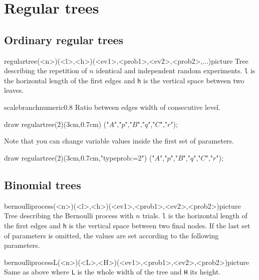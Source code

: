 \documentclass[11pt,a4paper,english]{article}
\begin{document}
\section{Regular trees}
\subsection{Ordinary regular trees}

\begin{rpobjet}{regulartree(<n>)(<l>,<h>)(<ev1>,<prob1>,<ev2>,<prob2>,...)}{picture}
Tree describing the repetition of $n$ identical and independent random experiments. \verb|l| is the horizontal length of the first edges and \verb|h| is the vertical space between two leaves.
\end{rpobjet}

\begin{mptparam}{scalebranch}{numeric}{0.8}
Ratio between edges width of consecutive level.
\end{mptparam}

\begin{exemple}[lefthand ratio=0.6]
draw regulartree(2)(3cm,0.7cm)
              ("$A$","$p$","$B$","$q$","$C$","$r$");
\end{exemple}

Note that you can change variable values inside the first set of parameters.

\begin{exemple}[lefthand ratio=0.6]
draw regulartree(2)(3cm,0.7cm,"typeprob:=2")
              ("$A$","$p$","$B$","$q$","$C$","$r$");
\end{exemple}


\subsection{Binomial trees}

\begin{rpobjet}{bernoulliprocess(<n>)(<l>,<h>)(<ev1>,<prob1>,<ev2>,<prob2>)}{picture}
Tree describing the Bernoulli process with $n$ trials. \verb|l| is the horizontal length of the first edges and \verb|h| is the vertical space between two final nodes. If the last set of parameters is omitted, the values are set according to the following parameters.
\end{rpobjet}


\begin{rpobjet}{bernoulliprocessL(<n>)(<L>,<H>)(<ev1>,<prob1>,<ev2>,<prob2>)}{picture}
Same as above where \verb|L| is the whole width of the tree and \verb|H| its height.
\end{rpobjet}
\end{document}
